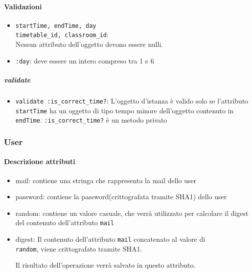 \documentclass[11pt,a4paper]{article}
\begin{document}
\paragraph{Validazioni}
\begin{itemize}
 \item \verb|startTime, endTime, day |\\
	\verb|timetable_id, classroom_id|:\\ 
Nessun attributo dell'oggetto devono essere nulli.
 \item \verb|:day|: deve essere un intero compreso tra 1 e 6
\end{itemize}
\subparagraph{validate}
\begin{itemize}
\item \verb|validate :is_correct_time?|: L'oggetto d'istanza è valido solo se l'attributo \verb|startTime| ha un oggetto di tipo tempo minore dell'oggetto contenuto in \verb|endTime|. \verb|:is_correct_time?|	 è un metodo privato
\end{itemize}
\subsubsection{User}
\paragraph{Descrizione attributi}
\begin{itemize}
 \item mail: contiene una stringa che rappresenta la mail dello user
 \item password: contiene la password(crittografata tramite SHA1) dello user
 \item random: contiene un valore casuale, che verrà utilizzato per calcolare il digest del contenuto dell'attributo \verb|mail|
 \item digest: Il contenuto dell'attributo \verb|mail| concatenato al valore di 
 \\ \verb|random|, viene crittografato tramite SHA1. 

Il risultato dell'operazione verrà salvato in questo attributo.
\end{itemize}
\end{document}
